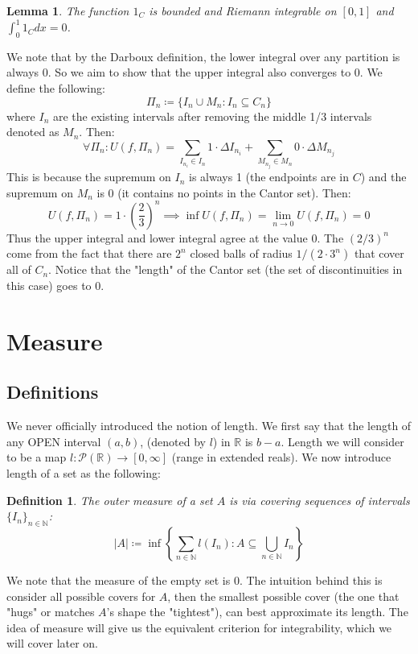 \documentclass[10pt,letterpaper]{article} %
\newtheorem{lem}{Lemma}[section]
\newtheorem{defn}{Definition}[section]
\begin{document}
\begin{lem}
The function $1_C$ is bounded and Riemann integrable on $[0, 1]$ and $\int_{0}^{1}1_C dx = 0$.
\end{lem}
We note that by the Darboux definition, the lower integral over any partition is always $0$. So we aim to show that the upper integral also converges to $0$. We define the following:
\begin{equation*}
  \Pi_n \coloneq \{I_n \cup M_n: I_n \subseteq C_n\}
\end{equation*}
where $I_n$ are the existing intervals after removing the middle 1/3 intervals denoted as $M_n$. Then:
\begin{equation*}
  \forall \Pi_n: U(f, \Pi_n) = \sum_{I_{n_i} \in I_n}1 \cdot \Delta I_{n_i} + \sum_{M_{n_j} \in M_n} 0 \cdot \Delta M_{n_j}
\end{equation*} 
This is because the supremum on $I_n$ is always 1 (the endpoints are in $C$) and the supremum on $M_n$ is 0 (it contains no points in the Cantor set). Then:
\begin{equation*}
  U(f, \Pi_n) = 1 \cdot \left(\frac{2}{3}\right)^n \implies \inf U(f, \Pi_n) = \lim_{n \xrightarrow{} 0}U(f, \Pi_n) = 0
\end{equation*}
Thus the upper integral and lower integral agree at the value $0$. The $(2/3)^n$ come from the fact that there are $2^n$ closed balls of radius $1/(2 \cdot 3^n)$ that cover all of $C_n$. Notice that the "length" of the Cantor set (the set of discontinuities in this case) goes to 0.

\pagebreak
\section{Measure}

\subsection{Definitions}
We never officially introduced the notion of length. We first say that the length of any OPEN interval $(a, b)$, (denoted by $l$) in $\mathbb{R}$ is $b-a$. Length we will consider to be a map $l: \mathcal{P}(\mathbb{R}) \xrightarrow{} [0, \infty]$ (range in extended reals). We now introduce length of a set as the following:
\begin{defn}
The outer measure of a set $A$ is via covering sequences of intervals $\{I_n\}_{n \in \mathbb{N}}$:
\begin{equation*}
  |A| \coloneq \inf\left\{\sum_{n \in \mathbb{N}}l(I_n) : A \subseteq \bigcup_{n \in \mathbb{N}} I_n\right\}
\end{equation*}
\end{defn}
We note that the measure of the empty set is $0$. The intuition behind this is consider all possible covers for $A$, then the smallest possible cover (the one that "hugs" or matches $A$'s shape the "tightest"), can best approximate its length. The idea of measure will give us the equivalent criterion for integrability, which we will cover later on.\\
\end{document}
